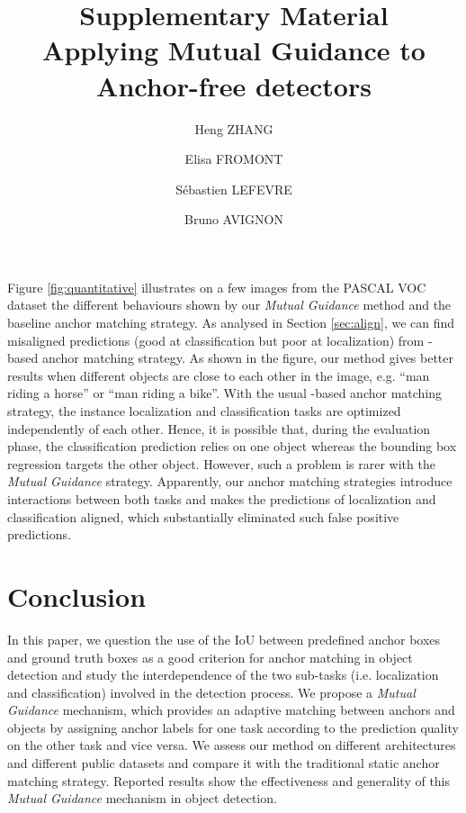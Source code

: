 \documentclass[runningheads]{llncs}
\begin{document}
Figure \ref{fig:quantitative} illustrates on a few images from the PASCAL VOC dataset the different behaviours shown by our \emph{Mutual Guidance} method and the baseline anchor matching strategy.
As analysed in Section \ref{sec:align}, we can find misaligned predictions (good at classification but poor at localization) from -based anchor matching strategy.
As shown in the figure, our method gives better results when different objects are close to each other in the image, e.g. ``man riding a horse'' or ``man riding a bike''.
With the usual -based anchor matching strategy, the instance localization and classification tasks are optimized independently of each other. Hence, it is possible that, during the evaluation phase, the classification prediction relies on one object whereas the bounding box regression targets the other object.
However, such a problem is rarer with the \emph{Mutual Guidance} strategy.
Apparently, our anchor matching strategies introduce interactions between both tasks and makes the predictions of localization and classification aligned, which substantially eliminated such false positive predictions.

\section{Conclusion}
\label{sec:conclusion}

In this paper, we question the use of the IoU between predefined anchor boxes and ground truth boxes as a good criterion for anchor matching in object detection and study the interdependence of the two sub-tasks (i.e. localization and classification) involved in the detection process.
We propose a \emph{Mutual Guidance} mechanism, which provides an adaptive matching between anchors and objects by assigning anchor labels for one task according to the prediction quality on the other task and vice versa.
We assess our method on different architectures and different public datasets and compare it with the traditional static anchor matching strategy. Reported results show the effectiveness and generality of this \emph{Mutual Guidance} mechanism in object detection.

\title{Supplementary Material \\ Applying Mutual Guidance to Anchor-free detectors} 
\author{Heng ZHANG \and
Elisa FROMONT  \and
Sébastien LEFEVRE \and
Bruno AVIGNON}
\maketitle
\end{document}
